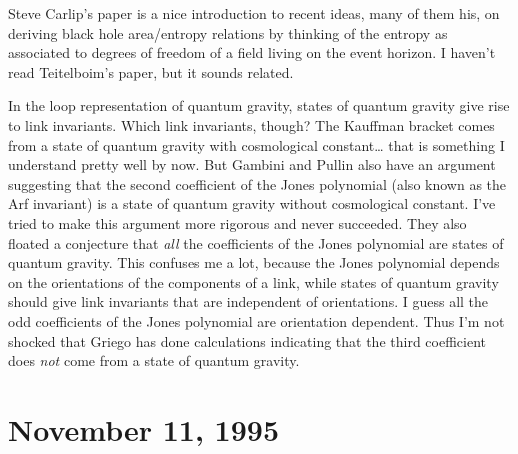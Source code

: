 \documentclass{article}
\renewcommand{\texttt}[1]{%
  \begingroup
  \ttfamily
  \begingroup\lccode`~=`/\lowercase{\endgroup\def~}{/\discretionary{}{}{}}%
  \begingroup\lccode`~=`[\lowercase{\endgroup\def~}{[\discretionary{}{}{}}%
  \begingroup\lccode`~=`.\lowercase{\endgroup\def~}{.\discretionary{}{}{}}%
  \catcode`/=\active\catcode`[=\active\catcode`.=\active
  \scantokens{#1\noexpand}%
  \endgroup
}
\begin{document}
Steve Carlip's paper is a nice introduction to recent ideas, many of
them his, on deriving black hole area/entropy relations by thinking of
the entropy as associated to degrees of freedom of a field living on the
event horizon. I haven't read Teitelboim's paper, but it sounds related.


In the loop representation of quantum gravity, states of quantum gravity
give rise to link invariants. Which link invariants, though? The
Kauffman bracket comes from a state of quantum gravity with cosmological
constant\ldots{} that is something I understand pretty well by now. But
Gambini and Pullin also have an argument suggesting that the second
coefficient of the Jones polynomial (also known as the Arf invariant) is
a state of quantum gravity without cosmological constant. I've tried to
make this argument more rigorous and never succeeded. They also floated
a conjecture that \emph{all} the coefficients of the Jones polynomial
are states of quantum gravity. This confuses me a lot, because the Jones
polynomial depends on the orientations of the components of a link,
while states of quantum gravity should give link invariants that are
independent of orientations. I guess all the odd coefficients of the
Jones polynomial are orientation dependent. Thus I'm not shocked that
Griego has done calculations indicating that the third coefficient does
\emph{not} come from a state of quantum gravity.
\hypertarget{week69}{%
\section{November 11, 1995}\label{week69}}
\end{document}
